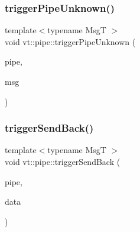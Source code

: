 \subsubsection{\texorpdfstring{trigger\+Pipe\+Unknown()}{triggerPipeUnknown()}}
{\footnotesize\ttfamily template$<$typename MsgT $>$ \\
void vt\+::pipe\+::trigger\+Pipe\+Unknown (\begin{DoxyParamCaption}\item[{\hyperlink{namespacevt_ac9852acda74d1896f48f406cd72c7bd3}{Pipe\+Type} const \&}]{pipe,  }\item[{MsgT $\ast$}]{msg }\end{DoxyParamCaption})}

\mbox{\label{namespacevt_1_1pipe_aa17c7b2572558dd48295d039f6f26c75}} 
\subsubsection{\texorpdfstring{trigger\+Send\+Back()}{triggerSendBack()}}
{\footnotesize\ttfamily template$<$typename MsgT $>$ \\
void vt\+::pipe\+::trigger\+Send\+Back (\begin{DoxyParamCaption}\item[{\hyperlink{namespacevt_ac9852acda74d1896f48f406cd72c7bd3}{Pipe\+Type} const \&}]{pipe,  }\item[{MsgT $\ast$}]{data }\end{DoxyParamCaption})}

